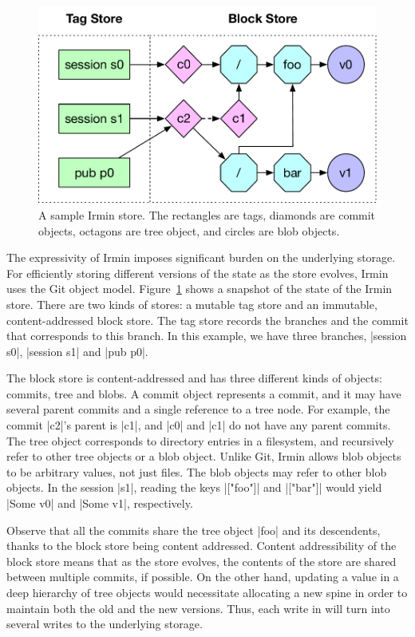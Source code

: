 \begin{figure}
	\vspace{-1.6cm}
	\centering
	\includegraphics[scale=0.4]{figures/irmin_store}
	\caption{A sample Irmin store. The rectangles are tags, diamonds are commit
	objects, octagons are tree object, and circles are blob objects.}
	\vspace{-0.8cm}
	\label{fig:irmin_store}
\end{figure}
The expressivity of Irmin imposes significant burden on the underlying storage.
For efficiently storing different versions of the state as the store evolves,
Irmin uses the Git object model. Figure~\ref{fig:irmin_store} shows a snapshot
of the state of the Irmin store. There are two kinds of stores: a mutable tag
store and an immutable, content-addressed block store. The tag store records
the branches and the commit that corresponds to this branch. In this example,
we have three branches, |session s0|, |session s1| and |pub p0|.

The block store is content-addressed and has three different kinds of objects:
commits, tree and blobs. A commit object represents a commit, and it may have
several parent commits and a single reference to a tree node. For example, the
commit |c2|'s parent is |c1|, and |c0| and |c1| do not have any parent commits.
The tree object corresponds to directory entries in a filesystem, and
recursively refer to other tree objects or a blob object. Unlike Git, Irmin
allows blob objects to be arbitrary values, not just files. The blob objects
may refer to other blob objects. In the session |s1|, reading the keys
|["foo"]| and |["bar"]| would yield |Some v0| and |Some v1|, respectively.

Observe that all the commits share the tree object |foo| and its descendents,
thanks to the block store being content addressed. Content addressibility of
the block store means that as the store evolves, the contents of the store are
shared between multiple commits, if possible. On the other hand, updating a
value in a deep hierarchy of tree objects would necessitate allocating a new
spine in order to maintain both the old and the new versions. Thus, each write
in \name will turn into several writes to the underlying storage.

